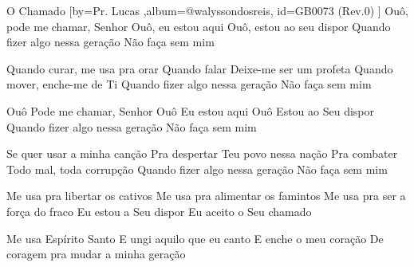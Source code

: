 \beginsong
{O Chamado %
}[by={Pr. Lucas %
},album={@walyssondosreis},
id={GB0073 %
(Rev.0) %
}]
Ouô, pode me chamar, Senhor
Ouô, eu estou aqui
Ouô, estou ao seu dispor
Quando fizer algo nessa geração
Não faça sem mim

Quando curar, me usa pra orar
Quando falar
Deixe-me ser um profeta
Quando mover, enche-me de Ti
Quando fizer algo nessa geração
Não faça sem mim

Ouô Pode me chamar, Senhor
Ouô Eu estou aqui
Ouô Estou ao Seu dispor
Quando fizer algo nessa geração
Não faça sem mim

Se quer usar a minha canção
Pra despertar
Teu povo nessa nação
Pra combater
Todo mal, toda corrupção
Quando fizer algo nessa geração
Não faça sem mim

Me usa pra libertar os cativos
Me usa pra alimentar os famintos
Me usa pra ser a força do fraco
Eu estou a Seu dispor
Eu aceito o Seu chamado

Me usa Espírito Santo
E ungi aquilo que eu canto
E enche o meu coração
De coragem pra mudar a minha geração


